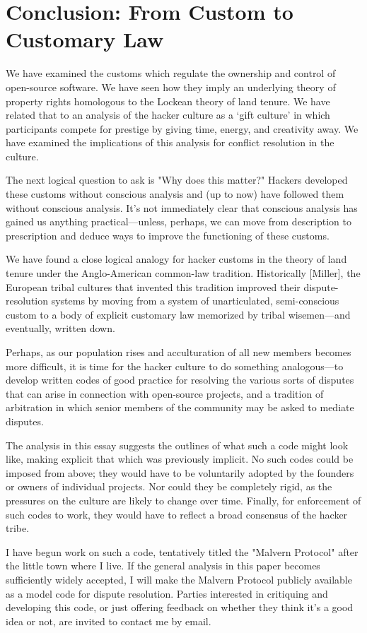 \section{Conclusion: From Custom to Customary Law}

We have examined the customs which regulate the ownership and control of
open-source software.  We have seen how they imply an underlying theory of
property rights homologous to the Lockean theory of land tenure.  We have
related that to an analysis of the hacker culture as a `gift culture' in which
participants compete for prestige by giving time, energy, and creativity away.
We have examined the implications of this analysis for conflict resolution in
the culture.

The next logical question to ask is "Why does this matter?" Hackers developed
these customs without conscious analysis and (up to now) have followed them
without conscious analysis.  It's not immediately clear that conscious analysis
has gained us anything practical—unless, perhaps, we can move from description
to prescription and deduce ways to improve the functioning of these customs.

We have found a close logical analogy for hacker customs in the theory of land
tenure under the Anglo-American common-law tradition.  Historically [Miller],
the European tribal cultures that invented this tradition improved their
dispute-resolution systems by moving from a system of unarticulated,
semi-conscious custom to a body of explicit customary law memorized by tribal
wisemen—and eventually, written down.

Perhaps, as our population rises and acculturation of all new members becomes
more difficult, it is time for the hacker culture to do something analogous—to
develop written codes of good practice for resolving the various sorts of
disputes that can arise in connection with open-source projects, and a tradition
of arbitration in which senior members of the community may be asked to mediate
disputes.

The analysis in this essay suggests the outlines of what such a code might look
like, making explicit that which was previously implicit.  No such codes could
be imposed from above; they would have to be voluntarily adopted by the founders
or owners of individual projects.  Nor could they be completely rigid, as the
pressures on the culture are likely to change over time.  Finally, for
enforcement of such codes to work, they would have to reflect a broad consensus
of the hacker tribe.

I have begun work on such a code, tentatively titled the "Malvern Protocol"
after the little town where I live.  If the general analysis in this paper
becomes sufficiently widely accepted, I will make the Malvern Protocol publicly
available as a model code for dispute resolution.  Parties interested in
critiquing and developing this code, or just offering feedback on whether they
think it's a good idea or not, are invited to contact me by email.
